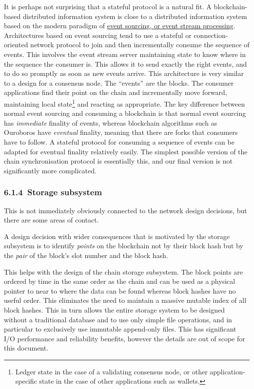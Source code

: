 \documentclass[11pt,a4paper]{article}
\begin{document}
It is perhaps not surprising that a stateful protocol is a natural fit.
A blockchain-based distributed information system is close to a
distributed information system based on the modern paradigm of
\href{https://en.wikipedia.org/wiki/Event-driven_architecture}{{event
sourcing, or event stream processing}}. Architectures based on event
sourcing tend to use a stateful or connection-oriented network protocol
to join and then incrementally consume the sequence of events. This
involves the event stream server maintaining state to know where in the
sequence the consumer is. This allows it to send exactly the right
events, and to do so promptly as soon as new events arrive. This
architecture is very similar to a design for a consensus node. The
``events'' are the blocks. The consumer applications find their point on
the chain and incrementally move forward, maintaining local
state\footnote{Ledger state in the case of a validating consensus node,
  or other application-specific state in the case of other applications
  such as wallets.} and reacting as appropriate. The key difference
between normal event sourcing and consuming a blockchain is that normal
event sourcing has \emph{immediate} finality of events, whereas
blockchain algorithms such as Ouroboros have \emph{eventual} finality,
meaning that there are forks that consumers have to follow. A stateful
protocol for consuming a sequence of events can be adapted for eventual
finality relatively easily. The simplest possible version of the chain
synchronisation protocol is essentially this, and our final version is
not significantly more complicated.

\hypertarget{storage-subsystem}{%
\subsubsection{​6.1.4​~Storage subsystem}\label{storage-subsystem}}

This is not immediately obviously connected to the network design
decisions, but there are some areas of contact.

A design decision with wider consequences that is motivated by the
storage subsystem is to identify \emph{points} on the blockchain not by
their block hash but by the \emph{pair} of the block's slot number and
the block hash.

This helps with the design of the chain storage subsystem. The block
points are ordered by time in the same order as the chain and can be
used as a physical pointer to near to where the data can be found
whereas block hashes have no useful order. This eliminates the need to
maintain a massive mutable index of all block hashes. This in turn
allows the entire storage system to be designed without a traditional
database and to use only simple file operations, and in particular to
exclusively use immutable append-only files. This has significant I/O
performance and reliability benefits, however the details are out of
scope for this document.
\end{document}
